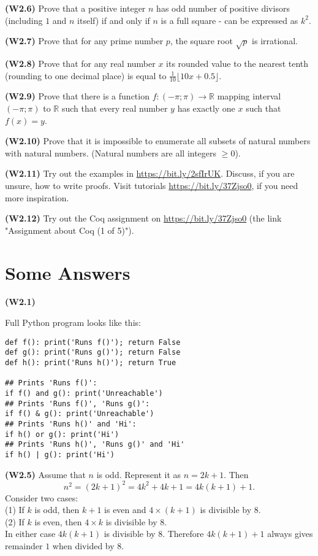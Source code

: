 \documentclass[jou]{apa6}
\begin{document}
{\bf (W2.6)} 
Prove that a positive integer $n$ has odd number of positive divisors 
(including $1$ and $n$ itself) if and only if $n$ is a full square - can be expressed as $k^2$.

{\bf (W2.7)} Prove that for any prime number $p$, the square root  
$\sqrt{p}$ is irrational.

{\bf (W2.8)}
Prove that for any real number $x$ its rounded value to the nearest tenth 
(rounding to one decimal place) is equal to $\frac{1}{10}\lfloor 10x + 0.5 \rfloor$.

{\bf (W2.9)}
Prove that there is a function  $f:(-\pi;\pi) \rightarrow \mathbb{R}$ 
mapping interval $(-\pi;\pi)$ to $\mathbb{R}$ such that every real number
$y$ has exactly one $x$ such that $f(x)=y$.

{\bf (W2.10)}
Prove that it is impossible to enumerate all subsets of natural numbers with natural numbers.
(Natural numbers are all integers $\geq 0$).

{\bf (W2.11)}
Try out the examples in \url{https://bit.ly/2sfIrUK}. 
Discuss, if you are unsure, how to write proofs. 
Visit tutorials \url{https://bit.ly/37Zjso0}, if you need more inspiration. 

{\bf (W2.12)}
Try out the Coq assignment on \url{https://bit.ly/37Zjso0}
(the link "Assignment about Coq (1 of 5)"). 

\newpage

\section{Some Answers}

{\bf (W2.1)}

Full Python program looks like this:
\begin{verbatim}
def f(): print('Runs f()'); return False
def g(): print('Runs g()'); return False
def h(): print('Runs h()'); return True

## Prints 'Runs f()':
if f() and g(): print('Unreachable')
## Prints 'Runs f()', 'Runs g()':
if f() & g(): print('Unreachable')
## Prints 'Runs h()' and 'Hi':
if h() or g(): print('Hi')
## Prints 'Runs h()', 'Runs g()' and 'Hi'
if h() | g(): print('Hi')
\end{verbatim}

{\bf (W2.5)} Assume that $n$ is odd. Represent it as 
$n = 2k+1$. Then 
$$n^2 = (2k+1)^2 = 4k^2 +4k + 1 = 4k(k+1) + 1.$$
Consider two cases:\\
(1) If $k$ is odd, then $k+1$ is even and 
$4\times (k+1)$ is divisible by $8$.\\
(2) If $k$ is even, then $4 \times k$ is divisible by 
$8$.\\
In either case $4k(k+1)$ is divisible by $8$. 
Therefore $4k(k+1) + 1$ always gives remainder $1$ when 
divided by $8$. 
\end{document}
